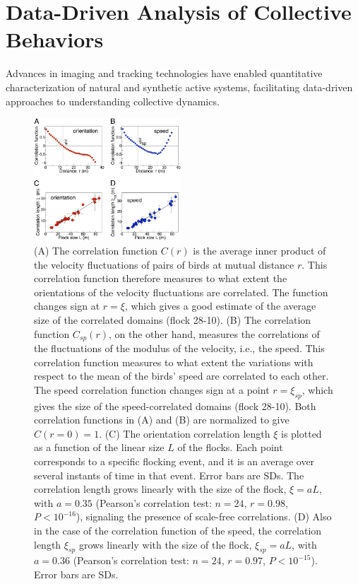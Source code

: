 \documentclass[a4paper, amsfonts, amssymb, amsmath, reprint, showkeys, showpacs, nofootinbib, twoside]{revtex4-2}
\begin{document}
\section{\label{sec:DataDrivenAnalysis} Data-Driven Analysis of Collective Behaviors}

Advances in imaging and tracking technologies have enabled quantitative characterization of natural and synthetic active systems, facilitating data-driven approaches to understanding collective dynamics.

\begin{figure}
    \includegraphics[width=0.49\textwidth]{./figs/VelocityCorr.png}
    \caption{
        \scriptsize
        \label{fig:velocityCorr}
        (A) The correlation function $C(r)$ is the average inner product of the velocity fluctuations of pairs of birds at mutual distance $r$. This correlation function therefore measures to what extent the orientations of the velocity fluctuations are correlated. The function changes sign at $r = \xi$, which gives a good estimate of the average size of the correlated domains (flock 28-10).
        (B) The correlation function $C_{sp}(r)$, on the other hand, measures the correlations of the fluctuations of the modulus of the velocity, i.e., the speed. This correlation function measures to what extent the variations with respect to the mean of the birds' speed are correlated to each other. The speed correlation function changes sign at a point $r = \xi_{sp}$, which gives the size of the speed-correlated domains (flock 28-10). Both correlation functions in (A) and (B) are normalized to give $C(r=0)=1$.
        (C) The orientation correlation length $\xi$ is plotted as a function of the linear size $L$ of the flocks. Each point corresponds to a specific flocking event, and it is an average over several instants of time in that event. Error bars are SDs. The correlation length grows linearly with the size of the flock, $\xi=aL$, with $a=0.35$ (Pearson's correlation test: $n=24$, $r=0.98$, $P<10^{-16}$), signaling the presence of scale-free correlations.
        (D) Also in the case of the correlation function of the speed, the correlation length $\xi_{sp}$ grows linearly with the size of the flock, $\xi_{sp}=aL$, with $a=0.36$ (Pearson's correlation test: $n=24$, $r=0.97$, $P<10^{-15}$). Error bars are SDs.
    }
\end{figure}
\end{document}
